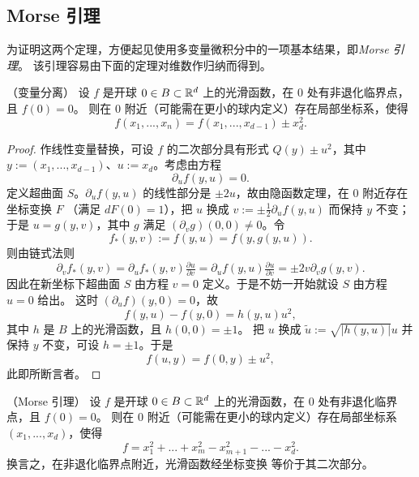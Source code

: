 \subsection{Morse 引理}
为证明这两个定理，方便起见使用多变量微积分中的一项基本结果，即\emph{Morse 引理}。
该引理容易由下面的定理对维数作归纳而得到。


\begin{theorem}\label{sepvar}（变量分离）
设 $f$ 是开球 $0\in B\subset \Bbb R^d$ 上的光滑函数，在 $0$ 处有非退化临界点，且 $f(0)=0$。
则在 $0$ 附近（可能需在更小的球内定义）存在局部坐标系，使得
$$
f(x_1,...,x_n)=f(x_1,...,x_{d-1})\pm x_d^2. 
$$
\end{theorem} 

\begin{proof} 作线性变量替换，可设 $f$ 的二次部分具有形式 $Q(y)\pm u^2$，其中
$y:=(x_1,...,x_{d-1})$、$u:=x_d$。考虑由方程
$$
\partial_uf(y,u)=0.
$$ 
定义超曲面 $S$。$\partial_uf(y,u)$ 的线性部分是 $\pm 2u$，故由隐函数定理，在 $0$ 附近存在坐标变换 $F$
（满足 $dF(0)=1$），把 $u$ 换成 $v:=\pm\frac{1}{2}\partial_uf(y,u)$ 而保持 $y$ 不变；于是
$u=g(y,v)$，其中 $g$ 满足 $(\partial_vg)(0,0)\ne 0$。令
$$
f_*(y,v):=f(y,u)=f(y,g(y,u)).
$$ 
则由链式法则
$$
\partial_v f_*(y,v)=\partial_u f_*(y,v)\tfrac{\partial u}{\partial v}=\partial_uf(y,u)\tfrac{\partial u}{\partial v}=\pm 2v\partial_{v}g(y,v).
$$
因此在新坐标下超曲面 $S$ 由方程 $v=0$ 定义。于是不妨一开始就设 $S$ 由方程 $u=0$ 给出。
这时 $(\partial_uf)(y,0)=0$，故
$$
f(y,u)-f(y,0)=h(y,u)u^2,
$$
其中 $h$ 是 $B$ 上的光滑函数，且 $h(0,0)=\pm 1$。
把 $u$ 换成 $\widetilde u:=\sqrt{|h(y,u)|}u$ 并保持 $y$ 不变，可设 $h=\pm 1$。于是
$$
f(u,y)=f(0,y)\pm u^2,
$$
此即所断言者。
\end{proof} 

\begin{corollary}\label{morsele}（Morse 引理）
设 $f$ 是开球 $0\in B\subset \Bbb R^d$ 上的光滑函数，在 $0$ 处有非退化临界点，且 $f(0)=0$。
则在 $0$ 附近（可能需在更小的球内定义）存在局部坐标系 $(x_1,...,x_d)$，使得
$$f=x_1^2+...+x_m^2-x_{m+1}^2-...-x_d^2.$$ 换言之，在非退化临界点附近，光滑函数经坐标变换
等价于其二次部分。
\end{corollary} 

